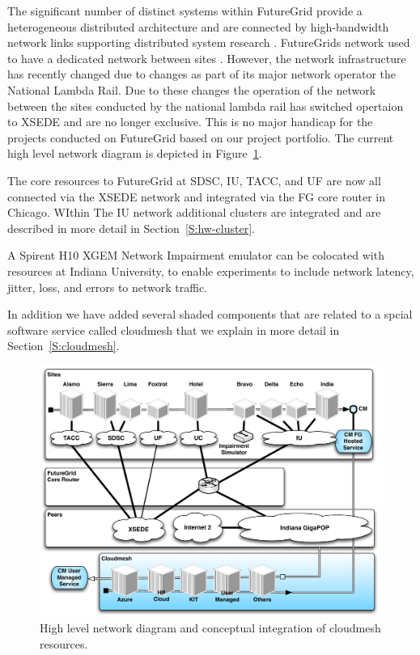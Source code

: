 The significant number of distinct systems within FutureGrid provide a
heterogeneous distributed architecture and are connected by
high-bandwidth network links supporting distributed system research
\cite{las12fg-bookchapter}. FutureGrids network used to have a
dedicated network between sites \cite{las12fg-bookchapter}. However,
the network infrastructure has recently changed due to changes as part
of its major network operator the National Lambda Rail.  Due to these
changes the operation of the network between the sites conducted by
the national lambda rail has switched opertaion to XSEDE and are no
longer exclusive. This is no major handicap for the projects conducted
on FutureGrid based on our project portfolio.  The current high level
network diagram is depicted in Figure~\ref{F:network}.

The core resources to FutureGrid at SDSC, IU, TACC, and UF are now all
connected via the XSEDE network and integrated via the FG core router
in Chicago. WIthin The IU network additional clusters are integrated
and are described in more detail in Section~\ref{S:hw-cluster}. 

A Spirent H10 XGEM Network Impairment emulator
\cite{www-network-impairment} can be colocated with resources at
Indiana University, to enable experiments to include network latency,
jitter, loss, and errors to network traffic.

In addition we have added several shaded components that are related
to a spcial software service called cloudmesh that we explain in more
detail in Section~\ref{S:cloudmesh}.


\begin{figure}[htb]
  \centering
    \includegraphics[width=1.0\textwidth]{images/fg-network-2014-cm.pdf}
  \caption{High level network diagram and conceptual integration of cloudmesh resources.}
\label{F:network}
\end{figure}

